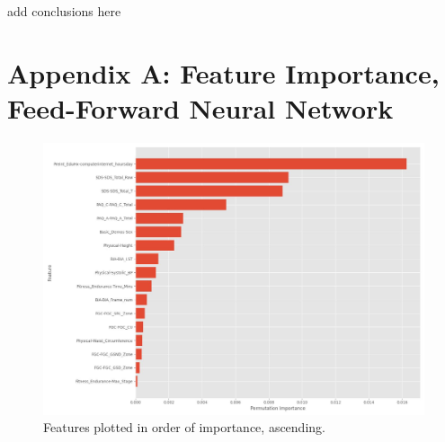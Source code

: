 \documentclass[11pt]{extarticle}
\begin{document}
\begin{mdframed}
    add conclusions here
\end{mdframed}

\pagebreak




\pagebreak

\section*{Appendix A: Feature Importance, Feed-Forward Neural Network}

\begin{figure}[h!]
    \centering
    \includegraphics[scale=0.4]{"./images/feature_importance.jpg"}
    \caption{Features plotted in order of importance, ascending.}
\end{figure}

\pagebreak
\end{document}
